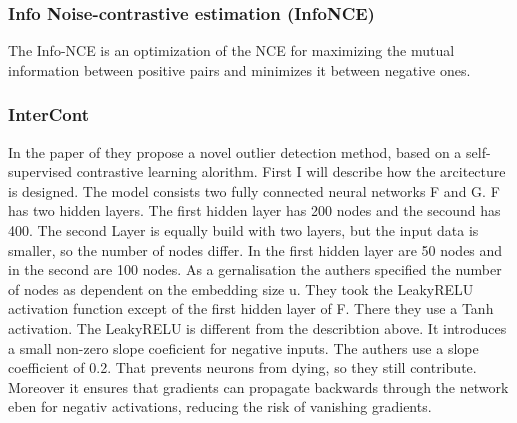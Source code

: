 \subsubsection{Info Noise-contrastive estimation (InfoNCE)}
The Info-NCE is an optimization of the NCE for maximizing the mutual information between positive pairs and minimizes it between negative ones.


\subsubsection{InterCont}
In the paper of \citeauthor{shenkar2022anomaly} they propose a novel outlier detection method, based on a self-supervised contrastive learning alorithm.
First I will describe how the arcitecture is designed.
The model consists two fully connected neural networks F and G. F has two hidden layers. The first hidden layer has 200 nodes and the secound has 400.
The second Layer is equally build with two layers, but the input data is smaller, so the number of nodes differ.
In the first hidden layer are 50 nodes and in the second are 100 nodes. As a gernalisation the authers specified the number of nodes as dependent on the embedding size u.
They took the LeakyRELU activation function except of the first hidden layer of F. There they use a Tanh activation. 
The LeakyRELU is different from the describtion above. It introduces a small non-zero slope coeficient for negative inputs. 
The authers use a slope coefficient of 0.2.
That prevents neurons from dying, so they still contribute. Moreover it ensures that gradients can propagate backwards through the network eben for negativ activations, 
reducing the risk of vanishing gradients.


